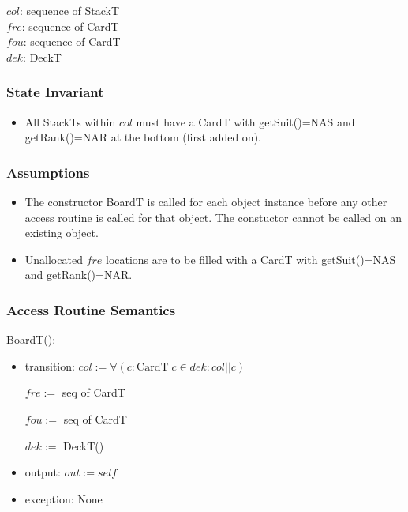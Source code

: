 \documentclass[12pt]{article}
\newcommand{\m}[1]{\mbox{#1}}
\begin{document}
$col$: sequence of StackT\\
$fre$: sequence of CardT\\
$fou$: sequence of CardT\\
$dek$: DeckT\\

\subsubsection* {State Invariant}

\begin{itemize}
  \item All StackTs within $col$ must have a CardT with getSuit()=\m{NAS}
  and getRank()=\m{NAR} at the bottom (first added on).
\end{itemize}

\subsubsection* {Assumptions}

\begin{itemize}
    \item The constructor BoardT is called for each object instance
    before any other access routine is called for that object. The
    constuctor cannot be called on an existing object.
    \item Unallocated $fre$ locations are to be filled with a CardT with
    getSuit()=\m{NAS} and getRank()=\m{NAR}.
\end{itemize}

\subsubsection* {Access Routine Semantics}

BoardT():
\begin{itemize}
    \item transition: $col := \forall(c : \mbox{CardT} | c \in dek : col||c)$
    
    \hspace{1.8cm} $fre :=$ seq of CardT
    
    \hspace{1.8cm} $fou :=$ seq of CardT
    
    \hspace{1.8cm} $dek :=$ DeckT()
    \item output: $out := \mathit{self}$
    \item exception: None
\end{itemize}
\end{document}

